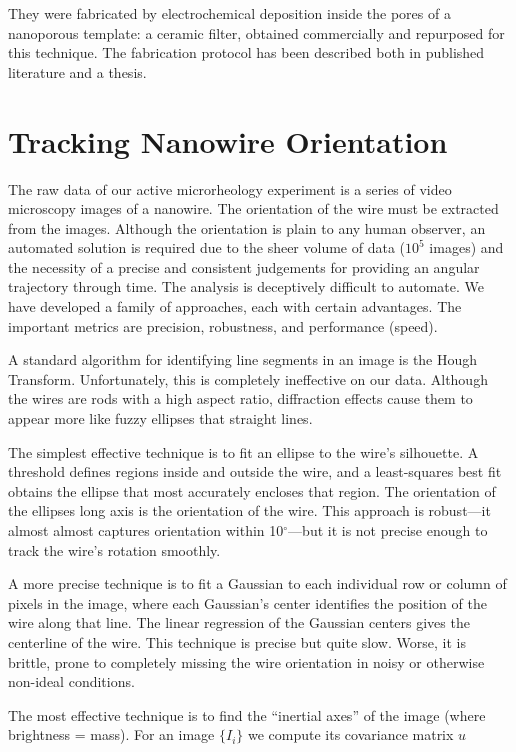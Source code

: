 They were fabricated by electrochemical deposition inside the pores of a nanoporous template: a ceramic filter, obtained commercially and repurposed for this technique. The fabrication protocol has been described both in published literature\cite{Chien2002} and a thesis\cite{TanaseThesis}.

\section{Tracking Nanowire Orientation}

The raw data of our active microrheology experiment is a series of video microscopy images of a nanowire. The orientation of the wire must be extracted from the images. Although the orientation is plain to any human observer, an automated solution is required due to the sheer volume of data ($10^5$ images) and the necessity of a precise and consistent judgements for providing an angular trajectory through time. The analysis is deceptively difficult to automate. We have developed a family of approaches, each with certain advantages. The important metrics are precision, robustness, and performance (speed).

A standard algorithm for identifying line segments in an image is the Hough Transform. Unfortunately, this is completely ineffective on our data. Although the wires are rods with a high aspect ratio, diffraction effects cause them to appear more like fuzzy ellipses that straight lines.

The simplest effective technique is to fit an ellipse to the wire's silhouette. A threshold defines regions inside and outside the wire, and a least-squares best fit obtains the ellipse that most accurately encloses that region. The orientation of the ellipses long axis is the orientation of the wire. This approach is robust---it almost almost captures orientation within 10$^\circ$---but it is not precise enough to track the wire's rotation smoothly.

A more precise technique is to fit a Gaussian to each individual row or column of pixels in the image, where each Gaussian's center identifies the position of the wire along that line. The linear regression of the Gaussian centers gives the centerline of the wire. This technique is precise but quite slow. Worse, it is brittle, prone to completely missing the wire orientation in noisy or otherwise non-ideal conditions.

The most effective technique is to find the ``inertial axes'' of the image (where brightness = mass). For an image $\{I_i\}$ we compute its covariance matrix $u$

